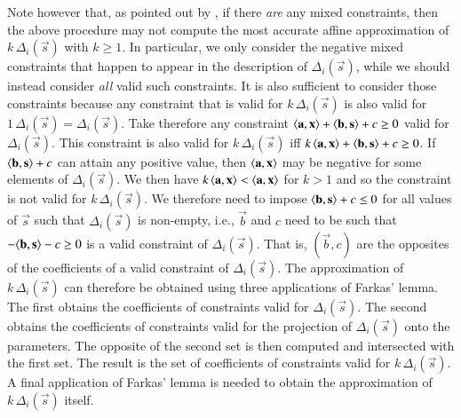 Note however that, as pointed out by \textcite{DeSmet2010personal},
if there \emph{are} any mixed constraints, then the above procedure may
not compute the most accurate affine approximation of
$k \, \Delta_i(\vec s)$ with $k \ge 1$.
In particular, we only consider the negative mixed constraints that
happen to appear in the description of $\Delta_i(\vec s)$, while we
should instead consider \emph{all} valid such constraints.
It is also sufficient to consider those constraints because any
constraint that is valid for $k \, \Delta_i(\vec s)$ is also
valid for $1 \, \Delta_i(\vec s) = \Delta_i(\vec s)$.
Take therefore any constraint
$\spv a x + \spv b s + c \ge 0$ valid for $\Delta_i(\vec s)$.
This constraint is also valid for $k \, \Delta_i(\vec s)$ iff
$k \, \spv a x + \spv b s + c \ge 0$.
If $\spv b s + c$ can attain any positive value, then $\spv a x$
may be negative for some elements of $\Delta_i(\vec s)$.
We then have $k \, \spv a x < \spv a x$ for $k > 1$ and so the constraint
is not valid for $k \, \Delta_i(\vec s)$.
We therefore need to impose $\spv b s + c \le 0$ for all values
of $\vec s$ such that $\Delta_i(\vec s)$ is non-empty, i.e.,
$\vec b$ and $c$ need to be such that $- \spv b s - c \ge 0$ is a valid
constraint of $\Delta_i(\vec s)$.  That is, $(\vec b, c)$ are the opposites
of the coefficients of a valid constraint of $\Delta_i(\vec s)$.
The approximation of $k \, \Delta_i(\vec s)$ can therefore be obtained
using three applications of Farkas' lemma.  The first obtains the coefficients
of constraints valid for $\Delta_i(\vec s)$.  The second obtains
the coefficients of constraints valid for the projection of $\Delta_i(\vec s)$
onto the parameters.  The opposite of the second set is then computed
and intersected with the first set.  The result is the set of coefficients
of constraints valid for $k \, \Delta_i(\vec s)$.  A final application
of Farkas' lemma is needed to obtain the approximation of
$k \, \Delta_i(\vec s)$ itself.

